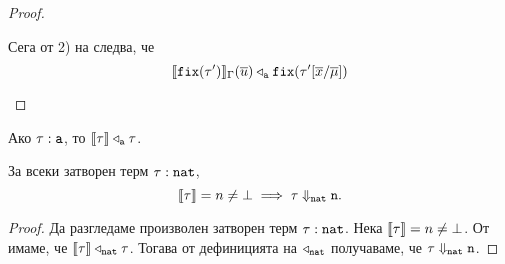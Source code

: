 \begin{proof}
\begin{itemize}
    Сега от 2) на  следва, че
    \[\llbracket{\texttt{fix}(\tau')}\rrbracket_\Gamma(\overline{u}) \triangleleft_{\texttt{a}} \texttt{fix}(\tau'[\overline{x}/\overline{\mu}])\]

  \end{itemize}
\end{proof}

\begin{framed}
  \begin{corollary}\label{cr:pcf:fundamental}
    Ако $\tau : \texttt{a}$, то $\llbracket{\tau}\rrbracket \triangleleft_{\texttt{a}} \tau$.
  \end{corollary}
\end{framed}

\begin{framed}
  \begin{theorem}\label{th:pcf:adequacy}
    За всеки затворен терм $\tau : \texttt{nat}$, 
    \[\llbracket{\tau}\rrbracket = n \neq \bot \implies \tau \Downarrow_{\texttt{nat}} \texttt{n}.\]
  \end{theorem}
\end{framed}
\begin{proof}
  Да разгледаме произволен затворен терм $\tau : \texttt{nat}$.
  Нека $\llbracket{\tau}\rrbracket = n \neq \bot$.
  От  имаме, че $\llbracket{\tau}\rrbracket \triangleleft_{\texttt{nat}} \tau$.
  Тогава от дефиницията на $\triangleleft_{\texttt{nat}}$ получаваме, че $\tau \Downarrow_{\texttt{nat}} \texttt{n}$.
\end{proof}



